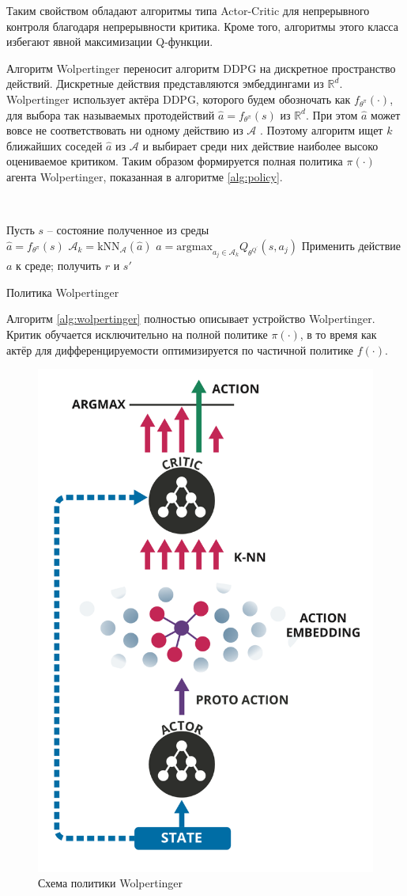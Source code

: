 \documentclass[a4paper, 12pt]{article}
\newcommand{\kNN}{\textrm{kNN}}
\newcommand{\argmax}{\textrm{argmax}}
\begin{document}
Таким свойством обладают алгоритмы типа Actor-Critic для непрерывного контроля благодаря непрерывности критика.
Кроме того, алгоритмы этого класса избегают явной максимизации Q-функции. 

Алгоритм Wolpertinger \cite{wolpertinger} переносит алгоритм DDPG \cite{ddpg} на дискретное пространство действий. Дискретные действия представляются эмбеддингами из $\mathbb{R}^d$.
Wolpertinger использует актёра DDPG, которого будем обозночать как $f_{\theta^\pi}(\cdot)$, для выбора так называемых протодействий $\hat{a} = f_{\theta^\pi}(s)$ из 
$\mathbb{R}^d$. При этом $\hat{a}$ может вовсе не соответствовать ни одному действию из $\mathcal{A}$ . Поэтому алгоритм ищет $k$ ближайших соседей $\hat{a}$ из $\mathcal{A}$ и выбирает среди них действие наиболее высоко оцениваемое критиком. Таким образом формируется полная политика $\pi(\cdot)$ агента Wolpertinger, показанная в алгоритме \ref{alg:policy}.

\

{	\small
\begin{algorithm}[H]
	\SetAlgoLined
	Пусть $s$ -- состояние полученное из среды \\
	$\hat{a} = f_{\theta^\pi}(s)$ 
	$\mathcal{A}_k = \kNN_{\mathcal{A}} (\hat{a})$ 
	$a = \argmax_{a_j \in \mathcal{A}_k} Q_{\theta^{Q^{\prime}}} (s, a_j)$ 
	Применить действие $a$ к среде; получить $r$ и $s \prime$
\caption{Политика Wolpertinger}
\label{alg:policy}
\end{algorithm}
}

Алгоритм \ref{alg:wolpertinger} полностью описывает устройство Wolpertinger.
Критик обучается исключительно на полной политике $\pi(\cdot)$, в то время как актёр для дифференцируемости оптимизируется по частичной политике $f(\cdot)$. 



\begin{figure}[H]
	\captionsetup{font=scriptsize}
	\centering
    		\includegraphics[width=.4\textwidth]{pics/wolpertinger}
   \captionsetup{justification=centering}
   \caption{Схема политики Wolpertinger}
\end{figure}
\end{document}
